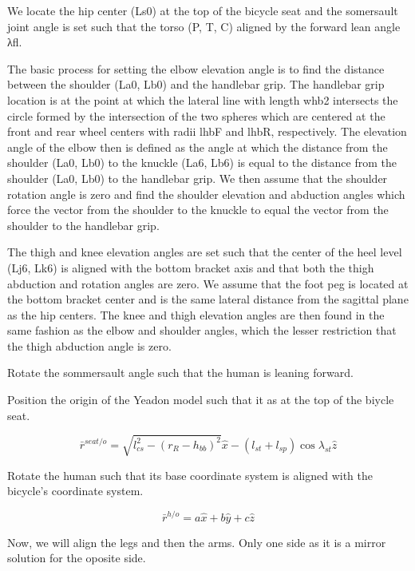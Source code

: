 \documentclass[10pt]{article}
\begin{document}
We locate the hip center (Ls0) at the top of the bicycle seat and the
somersault joint angle is set such that the torso (P, T, C) aligned by the
forward lean angle λfl.

The basic process for setting the elbow elevation angle is to find the distance
between the shoulder (La0, Lb0) and the handlebar grip. The handlebar grip
location is at the point at which the lateral line with length whb2 intersects
the circle formed by the intersection of the two spheres which are centered at
the front and rear wheel centers with radii lhbF and lhbR, respectively. The
elevation angle of the elbow then is defined as the angle at which the distance
from the shoulder (La0, Lb0) to the knuckle (La6, Lb6) is equal to the distance
from the shoulder (La0, Lb0) to the handlebar grip. We then assume that the
shoulder rotation angle is zero and find the shoulder elevation and abduction
angles which force the vector from the shoulder to the knuckle to equal the
vector from the shoulder to the handlebar grip.

The thigh and knee elevation angles are set such that the center of the heel
level (Lj6, Lk6) is aligned with the bottom bracket axis and that both the
thigh abduction and rotation angles are zero. We assume that the foot peg is
located at the bottom bracket center and is the same lateral distance from the
sagittal plane as the hip centers. The knee and thigh elevation angles are then
found in the same fashion as the elbow and shoulder angles, which the lesser
restriction that the thigh abduction angle is zero.

Rotate the sommersault angle such that the human is leaning forward.

Position the origin of the Yeadon model such that it as at the top of the
biycle seat.

\begin{equation}
  \bar{r}^{seat/o} = \sqrt{l_{cs}^2 - (r_R - h_{bb})^2} \hat{x} - (l_{st} + l_{sp})
  \operatorname{cos}\lambda_{st} \hat{z}
\end{equation}

Rotate the human such that its base coordinate system is aligned with the
bicycle's coordinate system.

\begin{equation}
  \bar{r}^{h/o} = a \hat{x} + b \hat{y} + c \hat{z}
\end{equation}

Now, we will align the legs and then the arms. Only one side as it is a mirror
solution for the oposite side.
\end{document}
